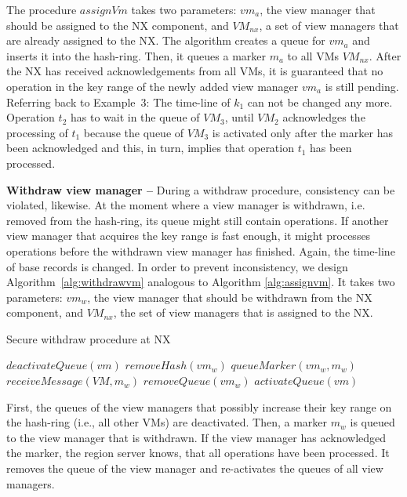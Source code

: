 The procedure $assignVm$ takes two parameters: $vm_a$, the view manager 
that should be assigned to the NX component, and $VM_{nx}$, a set of view 
managers that are already assigned to the NX. The algorithm creates a 
queue for $vm_a$ and inserts it into the hash-ring. Then, it queues a 
marker $m_a$ to all VMs $VM_{nx}$. After the NX has received acknowledgements 
from all VMs, it is guaranteed that no operation in the key range of the newly 
added view manager $vm_a$ is still pending. Referring back to Example~3: The 
time-line of $k_1$ can not be changed any more. Operation $t_2$ has to 
wait in the queue of $VM_3$, until $VM_2$ acknowledges the processing of 
$t_1$ because the queue of $VM_3$ is activated only after the marker has been 
acknowledged and this, in turn, implies that operation $t_1$ has been 
processed. 

\noindent
\textbf{Withdraw view manager -- }During a withdraw procedure, 
consistency can be violated, likewise. At the moment where a view manager is 
withdrawn, i.e. removed from the hash-ring, its queue might still contain 
operations. If another view manager that acquires the key range is fast 
enough, it might processes operations before the withdrawn view manager 
has finished. Again, the time-line of base records is changed. In order 
to prevent inconsistency, we design Algorithm~\ref{alg:withdrawvm} 
analogous to Algorithm \ref{alg:assignvm}. It takes two parameters: 
$vm_w$, the view manager that should be withdrawn from the NX component, 
and $VM_{nx}$, the set of view managers that is assigned to the NX. 


\begin{algorithm}
\caption{Secure withdraw procedure at NX}
\label{alg:withdrawvm}
\begin{algorithmic}[5]
\State $deactivateQueue(vm)$
\EndFor
\State $removeHash(vm_w)$
\State $queueMarker(vm_w, m_w)$
\State $receiveMessage(VM, m_w)$	
\EndFor
\State $removeQueue(vm_w)$
\State $activateQueue(vm)$
\EndFor
\EndProcedure
\end{algorithmic}
\end{algorithm}

First, the queues of the view managers that possibly increase their 
key range on the hash-ring (i.e., all other VMs) are deactivated. Then, 
a marker $m_w$ is queued to the view manager that is withdrawn. If the 
view manager has acknowledged the marker, the region server knows, that 
all operations have been processed. It removes the queue of the view 
manager and re-activates the queues of all view managers. 


